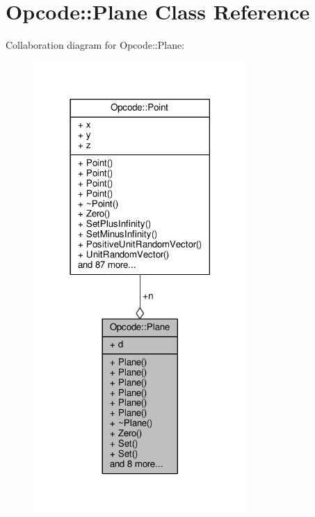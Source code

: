 \hypertarget{classOpcode_1_1Plane}{}\section{Opcode\+:\+:Plane Class Reference}
\label{classOpcode_1_1Plane}


Collaboration diagram for Opcode\+:\+:Plane\+:
\nopagebreak
\begin{figure}[H]
\begin{center}
\leavevmode
\includegraphics[width=230pt]{de/dff/classOpcode_1_1Plane__coll__graph}
\end{center}
\end{figure}
